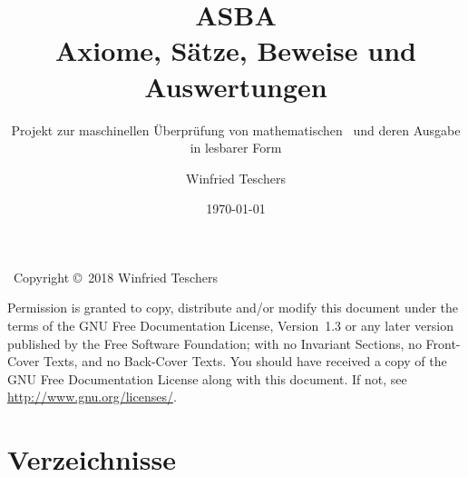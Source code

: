 \titlehead{
	{\Large Dr. Winfried Teschers}\\
	Anton-Günther-Straße 26c\\91083 Baiersdorf\\
	{\footnotesize winfried.teschers@t-online.de}
}
\subject{Projektdokument}
\title{{\Huge ASBA}\\Axiome, Sätze, Beweise und Auswertungen}
\subtitle{Projekt zur maschinellen Überprüfung von mathematischen \Beweisen\ und deren Ausgabe in lesbarer Form}
\author{Winfried Teschers}
\date{\today}
\publishers{\vspace{1cm}\normalsize
	Es wird ein Programmsystem beschrieben, das zu eingegebenen \Axiomen, \Saetzen\ und \Beweisen\ letztere prüft, \Auswertungen\ generiert und unter Zuhilfenahme gegebener \Ausgabeschemata\ eine Ausgabe im \LaTeX-Format in mathematisch üblicher Schreibweise mit \Formeln\ erstellt.
}



	\maketitle
	~\vfill Copyright \copyright\ 2018 Winfried Teschers\bigskip

	\begin{otherlanguage}{english}
		Permission is granted to copy, distribute and/or modify this document under the terms of the GNU Free Documentation License, Version~1.3 or any later version published by the Free Software Foundation; with no Invariant Sections, no Front-Cover Texts, and no Back-Cover Texts.
		You should have received a copy of the GNU Free Documentation License along with this document.
		If not, see \url{http://www.gnu.org/licenses/}.
	\end{otherlanguage}

	\tableofcontents
	\Endchapter

	
	
	
	\begin{offen}%
		
	\end{offen}%
	
	

	\chapter     {Verzeichnisse}%
	\label   {app-Verzeichnisse}

